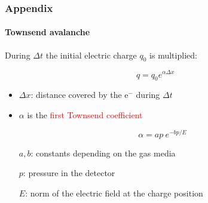 \documentclass[14pt]{beamer}
\begin{document}
\begin{frame}
  \frametitle{Appendix}
  \framesubtitle{Townsend avalanche}

  During $\Delta t$ the initial electric charge $q_0$ is multiplied:

  \begin{equation}
    q = q_0 e^{\alpha \Delta x}
    \label{eq:townsend}
  \end{equation}

\begin{itemize}
  \item $\Delta x$: distance covered by the e$^-$ during $\Delta t$
  \item $\alpha$ is the \textcolor{red}{first Townsend coefficient}

  \[\alpha = ap \ e^{-bp/E}\]

  $a, b$: constants depending on the gas media

  $p$: pressure in the detector

  $E$: norm of the electric field at the charge position
\end{itemize}

\end{frame}
\end{document}
